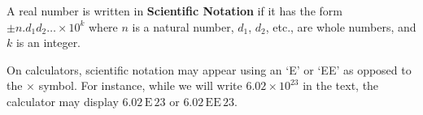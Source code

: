 \begin{tcolorbox}
\begin{defn} \label{scientificnotation}

A real number is written in \textbf{Scientific Notation} if it has the form $\pm n . d_{1} d_{2} \ldots \times 10^{k}$ where $n$ is a natural number, $d_{1}$, $d_{2}$, etc., are whole numbers, and $k$ is an integer.

\end{defn}
\end{tcolorbox}

On calculators, scientific notation may appear using an `E' or `EE' as opposed to the $\times$ symbol.  For instance, while we will write $6.02 \times 10^{23}$ in the text, the calculator may display $6.02\, \text{E} \, 23$ or $6.02\, \text{EE} \, 23$. 

